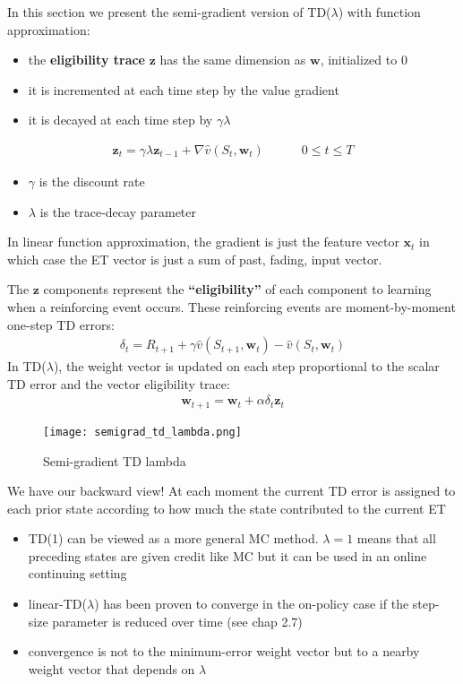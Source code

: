 \documentclass[sutton_barto_notes.tex]{subfiles}
\begin{document}
 In this section we present the semi-gradient version of TD($\lambda$) with function approximation: 
\begin{itemize}
\item the \textbf{eligibility trace} $\mathbf{z}$ has the same dimension as $\mathbf{w}$, initialized to $0$ 
\item it is incremented at each time step by the value gradient 
\item it is decayed at each time step by $\gamma \lambda$ 
\end{itemize}
\begin{align}\mathbf{z}_t = \gamma \lambda \mathbf{z}_{t-1} + \nabla \hat{v}(S_t, \mathbf{w}_t) \quad \quad \quad 0 \leq t \leq T \label{eq:12.4}\tag{12.4}
\end{align}
\begin{itemize}
\item $\gamma$ is the discount rate 
\item $\lambda$ is the trace-decay parameter 
\end{itemize}

 In linear function approximation, the gradient is just the feature vector $\mathbf{x}_t$ in which case the ET vector is just a sum of past, fading, input vector. 

 The $\mathbf{z}$ components represent the \textbf{“eligibility”} of each component to learning when a reinforcing event occurs. These reinforcing events are moment-by-moment one-step TD errors: 
\begin{align}\delta_t = R_{t+1} + \gamma \hat{v}(S_{t+1}, \mathbf{w}_t) - \hat{v}(S_t, \mathbf{w}_t) \label{eq:12.5}\tag{12.5}\end{align}
 In TD($\lambda$), the weight vector is updated on each step proportional to the scalar TD error and the vector eligibility trace: 
\begin{align}\mathbf{w}_{t+1} = \mathbf{w}_t + \alpha \delta_t \mathbf{z}_t \label{eq:12.6}\tag{12.6}\end{align}

\begin{figure}[h!]
    \centering
     \texttt{[image: semigrad\_td\_lambda.png]}
    \caption{ Semi-gradient TD lambda }
\end{figure}

 We have our backward view! At each moment the current TD error is assigned to each prior state according to how much the state contributed to the current ET 
\begin{itemize}
\item TD(1) can be viewed as a more general MC method. $\lambda = 1$ means that all preceding states are given credit like MC but it can be used in an online continuing setting 
\item linear-TD($\lambda$) has been proven to converge in the on-policy case if the step-size parameter is reduced over time (see chap 2.7) 
\item convergence is not to the minimum-error weight vector but to a nearby weight vector that depends on $\lambda$ 
\end{itemize}
\end{document}
